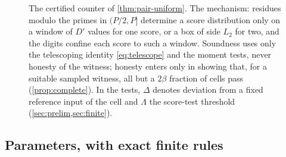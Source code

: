 \documentclass[11pt,letterpaper]{article}
\theoremstyle{definition}
\theoremstyle{remark}
\begin{document}
\begin{figure}[t]
{}
\caption{The certified counter of \cref{thm:pair-uniform}. The
mechanism: residues modulo the primes in \((P/2,P]\) determine a score
distribution only on a window of \(D'\) values for one score, or a
box of side \(L_2\) for two, and the digits confine each score to such
a window. Soundness
uses only the telescoping identity \eqref{eq:telescope} and the moment
tests, never honesty of the witness; honesty enters only in showing
that, for a suitable sampled witness, all but a $2\beta$ fraction of cells pass
(\cref{prop:complete}). In the tests, \(\Delta\) denotes deviation from a
fixed reference input of the cell and \(\Lambda\) the score-test threshold
(\cref{sec:prelim,sec:finite}).}
\label{fig:counter}
\end{figure}

\subsection{Parameters, with exact finite rules}\label{sec:finite}
\end{document}
